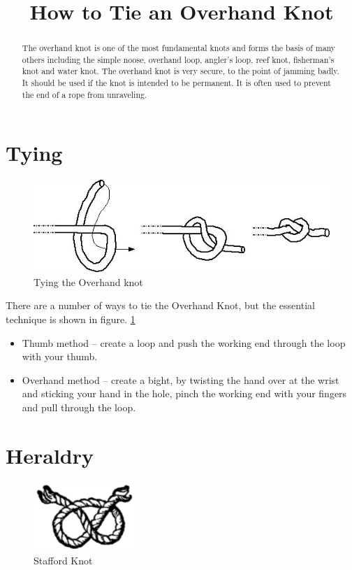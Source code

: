 \documentclass[a4paper,12pt]{article}
\title{How to Tie an Overhand Knot}
\author{}
\begin{document}
\maketitle 
\begin{abstract}
The overhand knot is one of the most fundamental knots and 
forms the basis of many others including the simple noose, overhand loop, 
angler's loop, reef knot, fisherman's knot and water knot. The overhand knot is 
very secure, to the point of jamming badly. It should be used if the knot is 
intended to be permanent. It is often used to prevent the end of a rope from 
unraveling. 
\end{abstract}

\section{Tying}
\begin{figure}[ht]
 \centering
 \includegraphics[scale=0.5]{tying.png}
 \caption{Tying the Overhand knot}
 \label{fig:overhand}
\end{figure}


There are a number of ways to tie the Overhand Knot, but the essential 
technique is shown in figure.
\ref{fig:overhand}
\begin{itemize}
 \item Thumb method \--- create a loop and push the working end through the 
loop with your thumb.
 \item Overhand method \--- create a bight, by twisting the hand over at the 
wrist and sticking your hand in the hole, pinch the working end with your 
fingers and pull through the loop.
\end{itemize}

\section{Heraldry}

\begin{figure}[ht]
 \centering
 \includegraphics[scale=1]{heraldry.png}
 \caption{Stafford Knot}
  \label{fig:heraldry}
\end{figure}
\end{document}
